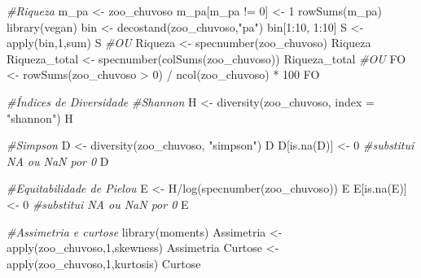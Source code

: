 \documentclass[
  letterpaper,
  DIV=11,
  numbers=noendperiod]{scrartcl}
\newenvironment{Shaded}{}{}
\newcommand{\AttributeTok}[1]{\textcolor[rgb]{0.49,0.56,0.16}{#1}}
\newcommand{\CommentTok}[1]{\textcolor[rgb]{0.38,0.63,0.69}{\textit{#1}}}
\newcommand{\DecValTok}[1]{\textcolor[rgb]{0.25,0.63,0.44}{#1}}
\newcommand{\FunctionTok}[1]{\textcolor[rgb]{0.02,0.16,0.49}{#1}}
\newcommand{\NormalTok}[1]{#1}
\newcommand{\OtherTok}[1]{\textcolor[rgb]{0.00,0.44,0.13}{#1}}
\newcommand{\SpecialCharTok}[1]{\textcolor[rgb]{0.25,0.44,0.63}{#1}}
\newcommand{\StringTok}[1]{\textcolor[rgb]{0.25,0.44,0.63}{#1}}
\begin{document}
\begin{Shaded}
\begin{Highlighting}[numbers=left,,]
\CommentTok{\#Riqueza}
\NormalTok{m\_pa }\OtherTok{\textless{}{-}}\NormalTok{ zoo\_chuvoso}
\NormalTok{m\_pa[m\_pa }\SpecialCharTok{!=} \DecValTok{0}\NormalTok{] }\OtherTok{\textless{}{-}} \DecValTok{1}
\FunctionTok{rowSums}\NormalTok{(m\_pa)}
\FunctionTok{library}\NormalTok{(vegan)}
\NormalTok{bin }\OtherTok{\textless{}{-}} \FunctionTok{decostand}\NormalTok{(zoo\_chuvoso,}\StringTok{"pa"}\NormalTok{)}
\NormalTok{bin[}\DecValTok{1}\SpecialCharTok{:}\DecValTok{10}\NormalTok{, }\DecValTok{1}\SpecialCharTok{:}\DecValTok{10}\NormalTok{]}
\NormalTok{S }\OtherTok{\textless{}{-}} \FunctionTok{apply}\NormalTok{(bin,}\DecValTok{1}\NormalTok{,sum)}
\NormalTok{S}
\CommentTok{\#OU}
\NormalTok{Riqueza }\OtherTok{\textless{}{-}} \FunctionTok{specnumber}\NormalTok{(zoo\_chuvoso)}
\NormalTok{Riqueza}
\NormalTok{Riqueza\_total }\OtherTok{\textless{}{-}} \FunctionTok{specnumber}\NormalTok{(}\FunctionTok{colSums}\NormalTok{(zoo\_chuvoso))}
\NormalTok{Riqueza\_total}
\CommentTok{\#OU}
\NormalTok{FO }\OtherTok{\textless{}{-}} \FunctionTok{rowSums}\NormalTok{(zoo\_chuvoso }\SpecialCharTok{\textgreater{}} \DecValTok{0}\NormalTok{) }\SpecialCharTok{/} \FunctionTok{ncol}\NormalTok{(zoo\_chuvoso) }\SpecialCharTok{*} \DecValTok{100}
\NormalTok{FO}

\CommentTok{\#Índices de Diversidade}
\CommentTok{\#Shannon}
\NormalTok{H }\OtherTok{\textless{}{-}} \FunctionTok{diversity}\NormalTok{(zoo\_chuvoso, }\AttributeTok{index =} \StringTok{"shannon"}\NormalTok{)}
\NormalTok{H}

\CommentTok{\#Simpson}
\NormalTok{D }\OtherTok{\textless{}{-}} \FunctionTok{diversity}\NormalTok{(zoo\_chuvoso, }\StringTok{"simpson"}\NormalTok{)}
\NormalTok{D}
\NormalTok{D[}\FunctionTok{is.na}\NormalTok{(D)] }\OtherTok{\textless{}{-}} \DecValTok{0} \CommentTok{\#substitui NA ou NaN por 0}
\NormalTok{D}

\CommentTok{\#Equitabilidade de Pielou}
\NormalTok{E }\OtherTok{\textless{}{-}}\NormalTok{ H}\SpecialCharTok{/}\FunctionTok{log}\NormalTok{(}\FunctionTok{specnumber}\NormalTok{(zoo\_chuvoso))}
\NormalTok{E}
\NormalTok{E[}\FunctionTok{is.na}\NormalTok{(E)] }\OtherTok{\textless{}{-}} \DecValTok{0} \CommentTok{\#substitui NA ou NaN por 0}
\NormalTok{E}

\CommentTok{\#Assimetria e curtose}
\FunctionTok{library}\NormalTok{(moments)}
\NormalTok{Assimetria }\OtherTok{\textless{}{-}} \FunctionTok{apply}\NormalTok{(zoo\_chuvoso,}\DecValTok{1}\NormalTok{,skewness)}
\NormalTok{Assimetria}
\NormalTok{Curtose }\OtherTok{\textless{}{-}} \FunctionTok{apply}\NormalTok{(zoo\_chuvoso,}\DecValTok{1}\NormalTok{,kurtosis)}
\NormalTok{Curtose}


\end{Highlighting}
\end{Shaded}
\end{document}

